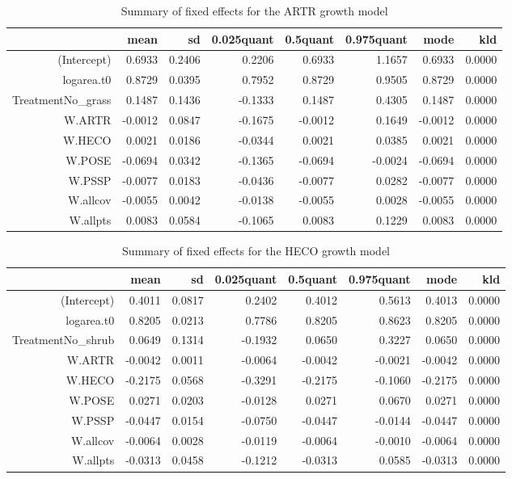 \begin{table}[ht]
\centering
\caption{Summary of fixed effects for the ARTR growth model} 
\label{ARTRgrowth}
\begin{tabular}{rrrrrrrr}
  \hline
 & mean & sd & 0.025quant & 0.5quant & 0.975quant & mode & kld \\ 
  \hline
(Intercept) & 0.6933 & 0.2406 & 0.2206 & 0.6933 & 1.1657 & 0.6933 & 0.0000 \\ 
  logarea.t0 & 0.8729 & 0.0395 & 0.7952 & 0.8729 & 0.9505 & 0.8729 & 0.0000 \\ 
  TreatmentNo\_grass & 0.1487 & 0.1436 & -0.1333 & 0.1487 & 0.4305 & 0.1487 & 0.0000 \\ 
  W.ARTR & -0.0012 & 0.0847 & -0.1675 & -0.0012 & 0.1649 & -0.0012 & 0.0000 \\ 
  W.HECO & 0.0021 & 0.0186 & -0.0344 & 0.0021 & 0.0385 & 0.0021 & 0.0000 \\ 
  W.POSE & -0.0694 & 0.0342 & -0.1365 & -0.0694 & -0.0024 & -0.0694 & 0.0000 \\ 
  W.PSSP & -0.0077 & 0.0183 & -0.0436 & -0.0077 & 0.0282 & -0.0077 & 0.0000 \\ 
  W.allcov & -0.0055 & 0.0042 & -0.0138 & -0.0055 & 0.0028 & -0.0055 & 0.0000 \\ 
  W.allpts & 0.0083 & 0.0584 & -0.1065 & 0.0083 & 0.1229 & 0.0083 & 0.0000 \\ 
   \hline
\end{tabular}
\end{table}

\begin{table}[ht]
\centering
\caption{Summary of fixed effects for the HECO growth model} 
\label{HECOgrowth}
\begin{tabular}{rrrrrrrr}
  \hline
 & mean & sd & 0.025quant & 0.5quant & 0.975quant & mode & kld \\ 
  \hline
(Intercept) & 0.4011 & 0.0817 & 0.2402 & 0.4012 & 0.5613 & 0.4013 & 0.0000 \\ 
  logarea.t0 & 0.8205 & 0.0213 & 0.7786 & 0.8205 & 0.8623 & 0.8205 & 0.0000 \\ 
  TreatmentNo\_shrub & 0.0649 & 0.1314 & -0.1932 & 0.0650 & 0.3227 & 0.0650 & 0.0000 \\ 
  W.ARTR & -0.0042 & 0.0011 & -0.0064 & -0.0042 & -0.0021 & -0.0042 & 0.0000 \\ 
  W.HECO & -0.2175 & 0.0568 & -0.3291 & -0.2175 & -0.1060 & -0.2175 & 0.0000 \\ 
  W.POSE & 0.0271 & 0.0203 & -0.0128 & 0.0271 & 0.0670 & 0.0271 & 0.0000 \\ 
  W.PSSP & -0.0447 & 0.0154 & -0.0750 & -0.0447 & -0.0144 & -0.0447 & 0.0000 \\ 
  W.allcov & -0.0064 & 0.0028 & -0.0119 & -0.0064 & -0.0010 & -0.0064 & 0.0000 \\ 
  W.allpts & -0.0313 & 0.0458 & -0.1212 & -0.0313 & 0.0585 & -0.0313 & 0.0000 \\ 
   \hline
\end{tabular}
\end{table}

